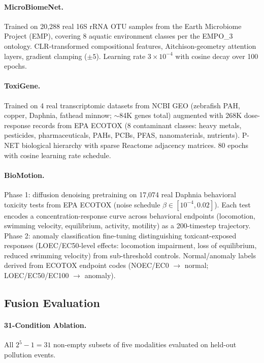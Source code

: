 \paragraph{MicroBiomeNet.}
Trained on 20,288 real 16S rRNA OTU samples from the Earth Microbiome
Project (EMP), covering 8 aquatic environment classes per the EMPO\_3
ontology. CLR-transformed compositional features, Aitchison-geometry
attention layers, gradient clamping ($\pm 5$). Learning rate $3 \times
10^{-4}$ with cosine decay over 100 epochs.

\paragraph{ToxiGene.}
Trained on 4 real transcriptomic datasets from NCBI GEO (zebrafish PAH,
copper, Daphnia, fathead minnow; $\sim$84K genes total) augmented with
268K dose-response records from EPA ECOTOX (8 contaminant classes: heavy
metals, pesticides, pharmaceuticals, PAHs, PCBs, PFAS, nanomaterials,
nutrients). P-NET biological hierarchy with sparse Reactome adjacency
matrices. 80 epochs with cosine learning rate schedule.

\paragraph{BioMotion.}
Phase 1: diffusion denoising pretraining on 17,074 real Daphnia behavioral
toxicity tests from EPA ECOTOX (noise schedule $\beta \in [10^{-4},
0.02]$). Each test encodes a concentration-response curve across behavioral
endpoints (locomotion, swimming velocity, equilibrium, activity, motility)
as a 200-timestep trajectory. Phase 2: anomaly classification fine-tuning
distinguishing toxicant-exposed responses (LOEC/EC50-level effects:
locomotion impairment, loss of equilibrium, reduced swimming velocity) from
sub-threshold controls. Normal/anomaly labels derived from ECOTOX endpoint
codes (NOEC/EC0 $\rightarrow$ normal; LOEC/EC50/EC100 $\rightarrow$ anomaly).

\subsection{Fusion Evaluation}

\paragraph{31-Condition Ablation.}
All $2^5 - 1 = 31$ non-empty subsets of five modalities evaluated on
held-out pollution events.

